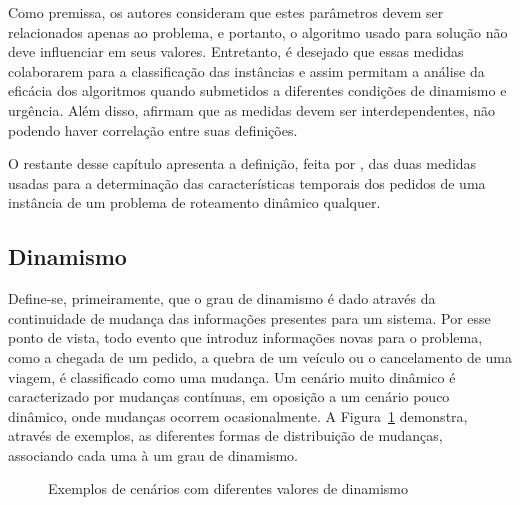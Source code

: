 Como premissa, os autores consideram que estes parâmetros devem ser 
relacionados apenas ao problema, e portanto, o algoritmo usado para solução 
não deve influenciar em seus valores.
Entretanto, é desejado que essas medidas colaborarem para a classificação das 
instâncias e assim permitam a análise da eficácia dos algoritmos quando 
submetidos a diferentes condições de dinamismo e urgência. 
Além disso,  afirmam que as medidas devem ser 
interdependentes, não podendo haver correlação entre suas definições. 

O restante desse capítulo apresenta a definição, feita por
, das duas medidas usadas para a determinação
das características temporais dos pedidos de uma instância de um problema de 
roteamento dinâmico qualquer.






\subsection{Dinamismo}\label{sec:dinamismo}
Define-se, primeiramente, que o grau de dinamismo é dado através da 
continuidade de mudança das informações presentes para um sistema. 
Por esse ponto de vista, todo evento que introduz informações novas para o 
problema, como a chegada de um pedido, a quebra de um veículo ou o cancelamento
de uma viagem, é classificado como uma mudança.
Um cenário muito dinâmico é caracterizado por mudanças contínuas, em oposição a
um cenário pouco dinâmico, onde mudanças ocorrem ocasionalmente.
A Figura~\ref{fig:van_lon_measures_2016_dynamism} demonstra, 
através de exemplos, as diferentes formas de distribuição de mudanças,
associando cada uma à um grau de dinamismo.

\begin{figure}[H]
    \begin{center}
        \caption{Exemplos de cenários com diferentes valores de dinamismo 
        \cite{van_lon_measures_2016}}
        \label{fig:van_lon_measures_2016_dynamism}
    \end{center} 
\end{figure}

